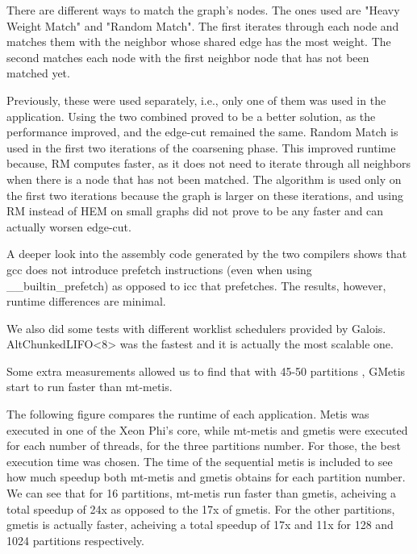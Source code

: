 \documentclass[abstract=on,9pt,twocolumn]{scrartcl}
\begin{document}

There are different ways to match the graph's nodes. The ones used are
"Heavy Weight Match" and "Random Match". The first iterates through each
node and matches them with the neighbor whose shared edge has the most
weight. The second matches each node with the first neighbor node that
has not been matched yet.

Previously, these were used separately, i.e., only one of them was
used in the application. Using the two combined proved to be a better
solution, as the performance improved, and the edge-cut remained the
same. Random Match is used in the first two iterations of the coarsening
phase. This improved runtime because, RM computes faster, as it does not
need to iterate through all neighbors when there is a node that has not
been matched. The algorithm is used only on the first two iterations
because the graph is larger on these iterations, and using RM instead of
HEM on small graphs did not prove to be any faster and can actually worsen
edge-cut.

A deeper look into the assembly code generated by the two compilers
shows that gcc does not introduce prefetch instructions (even when using
\_\_builtin\_prefetch) as opposed to icc that prefetches. The results,
however, runtime differences are minimal.

We also did some tests with different worklist schedulers provided by
Galois. AltChunkedLIFO<8> was the fastest and it is actually the most
scalable one.

Some extra measurements allowed us to find that with 45-50 partitions
, GMetis start to run faster than mt-metis.



The following figure compares the runtime of each application. Metis was
executed in one of the Xeon Phi's core, while mt-metis and gmetis were executed
for each number of threads, for the three partitions number. For those, the best execution time was
chosen. The time of the sequential metis is included to see how much
speedup both mt-metis and gmetis obtains for each partition number. 
We can see that for 16 partitions, mt-metis run faster than gmetis,
acheiving a total speedup of 24x as opposed to the 17x of gmetis.
For the other partitions, gmetis is actually faster, acheiving a total
speedup of 17x and 11x for 128 and 1024 partitions respectively.
\end{document}
